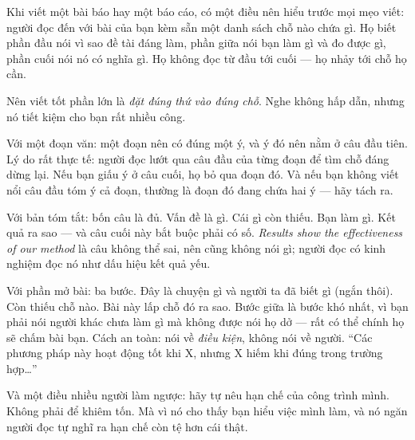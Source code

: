 \documentclass[../../english.tex]{subfiles}
\begin{document}
\begin{dongian}
Khi viết một bài báo hay một báo cáo, có một điều nên hiểu trước mọi mẹo viết: người đọc đến với bài của bạn kèm sẵn một danh sách chỗ nào chứa gì. Họ biết phần đầu nói vì sao đề tài đáng làm, phần giữa nói bạn làm gì và đo được gì, phần cuối nói nó có nghĩa gì. Họ không đọc từ đầu tới cuối --- họ nhảy tới chỗ họ cần.

Nên viết tốt phần lớn là \emph{đặt đúng thứ vào đúng chỗ}. Nghe không hấp dẫn, nhưng nó tiết kiệm cho bạn rất nhiều công.

Với một đoạn văn: một đoạn nên có đúng một ý, và ý đó nên nằm ở câu đầu tiên. Lý do rất thực tế: người đọc lướt qua câu đầu của từng đoạn để tìm chỗ đáng dừng lại. Nếu bạn giấu ý ở câu cuối, họ bỏ qua đoạn đó. Và nếu bạn không viết nổi câu đầu tóm ý cả đoạn, thường là đoạn đó đang chứa hai ý --- hãy tách ra.

Với bản tóm tắt: bốn câu là đủ. Vấn đề là gì. Cái gì còn thiếu. Bạn làm gì. Kết quả ra sao --- và câu cuối này bắt buộc phải có số. \emph{Results show the effectiveness of our method} là câu không thể sai, nên cũng không nói gì; người đọc có kinh nghiệm đọc nó như dấu hiệu kết quả yếu.

Với phần mở bài: ba bước. Đây là chuyện gì và người ta đã biết gì (ngắn thôi). Còn thiếu chỗ nào. Bài này lấp chỗ đó ra sao. Bước giữa là bước khó nhất, vì bạn phải nói người khác chưa làm gì mà không được nói họ dở --- rất có thể chính họ sẽ chấm bài bạn. Cách an toàn: nói về \emph{điều kiện}, không nói về người. ``Các phương pháp này hoạt động tốt khi X, nhưng X hiếm khi đúng trong trường hợp\ldots''

Và một điều nhiều người làm ngược: hãy tự nêu hạn chế của công trình mình. Không phải để khiêm tốn. Mà vì nó cho thấy bạn hiểu việc mình làm, và nó ngăn người đọc tự nghĩ ra hạn chế còn tệ hơn cái thật.
\end{dongian}
\end{document}
